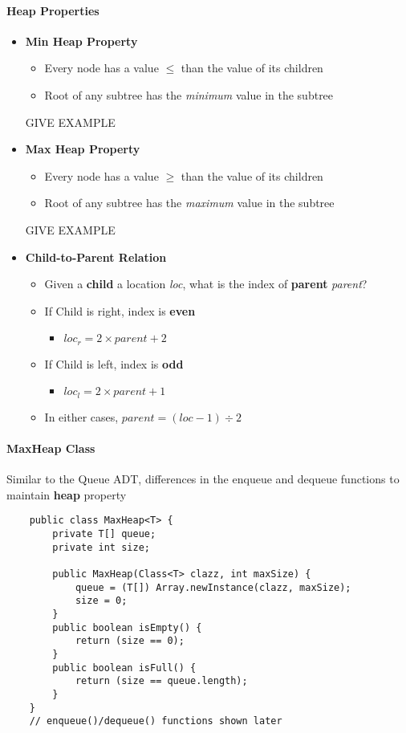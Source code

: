 \documentclass[10pt, 
a4paper, 
oneside, 
headinclude, footinclude, 
BCOR5mm]
{scrartcl}
\begin{document}
\paragraph{\textbf{Heap Properties}}
\begin{itemize}
    \item \textbf{Min Heap Property}
    \begin{itemize}
        \item Every node has a value $\leq$ than the value of its children
        \item Root of any subtree has the \textit{minimum} value in the subtree    
    \end{itemize}
    GIVE EXAMPLE
    \item \textbf{Max Heap Property}
    \begin{itemize}
        \item Every node has a value $\geq$ than the value of its children
        \item Root of any subtree has the \textit{maximum} value in the subtree
    \end{itemize}
    GIVE EXAMPLE
    \item \textbf{Child-to-Parent Relation}
    \begin{itemize}
        \item Given a \textbf{child} a location \textit{loc}, what is the index of \textbf{parent} \textit{parent}?
        \item If Child is right, index is \textbf{even}
        \begin{itemize}
            \item $loc_r = 2 \times parent + 2$
        \end{itemize} 
        \item If Child is left, index is \textbf{odd}
        \begin{itemize}
            \item $loc_l = 2 \times parent + 1$
        \end{itemize}
        \item In either cases, $parent = (loc - 1) \div 2$
    \end{itemize}
\end{itemize}

\paragraph{\textbf{MaxHeap Class}}
Similar to the Queue ADT, differences in the enqueue and dequeue functions to maintain \textbf{heap} property
\begin{lstlisting}
    public class MaxHeap<T> {
        private T[] queue;
        private int size;

        public MaxHeap(Class<T> clazz, int maxSize) {
            queue = (T[]) Array.newInstance(clazz, maxSize);
            size = 0;
        }
        public boolean isEmpty() {
            return (size == 0);
        }
        public boolean isFull() {
            return (size == queue.length);
        }
    }
    // enqueue()/dequeue() functions shown later
\end{lstlisting}
\end{document}
